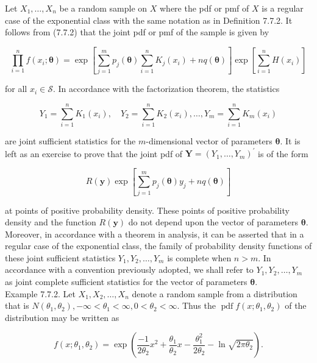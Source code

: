 Let $X_{1}, \ldots, X_{n}$ be a random sample on $X$ where the pdf or pmf of $X$ is a regular case of the exponential class with the same notation as in Definition 7.7.2. It follows from (7.7.2) that the joint pdf or pmf of the sample is given by


\begin{equation*}
\prod_{i=1}^{n} f\left(x_{i} ; \boldsymbol{\theta}\right)=\exp \left[\sum_{j=1}^{m} p_{j}(\boldsymbol{\theta}) \sum_{i=1}^{n} K_{j}\left(x_{i}\right)+n q(\boldsymbol{\theta})\right] \exp \left[\sum_{i=1}^{n} H\left(x_{i}\right)\right] \tag{7.7.3}
\end{equation*}


for all $x_{i} \in \mathcal{S}$. In accordance with the factorization theorem, the statistics

$$
Y_{1}=\sum_{i=1}^{n} K_{1}\left(x_{i}\right), \quad Y_{2}=\sum_{i=1}^{n} K_{2}\left(x_{i}\right), \ldots, Y_{m}=\sum_{i=1}^{n} K_{m}\left(x_{i}\right)
$$

are joint sufficient statistics for the $m$-dimensional vector of parameters $\boldsymbol{\theta}$. It is left as an exercise to prove that the joint pdf of $\mathbf{Y}=\left(Y_{1}, \ldots, Y_{m}\right)^{\prime}$ is of the form


\begin{equation*}
R(\mathbf{y}) \exp \left[\sum_{j=1}^{m} p_{j}(\boldsymbol{\theta}) y_{j}+n q(\boldsymbol{\theta})\right] \tag{7.7.4}
\end{equation*}


at points of positive probability density. These points of positive probability density and the function $R(\mathbf{y})$ do not depend upon the vector of parameters $\boldsymbol{\theta}$. Moreover, in accordance with a theorem in analysis, it can be asserted that in a regular case of the exponential class, the family of probability density functions of these joint sufficient statistics $Y_{1}, Y_{2}, \ldots, Y_{m}$ is complete when $n>m$. In accordance with a convention previously adopted, we shall refer to $Y_{1}, Y_{2}, \ldots, Y_{m}$ as joint complete sufficient statistics for the vector of parameters $\boldsymbol{\theta}$.\\
Example 7.7.2. Let $X_{1}, X_{2}, \ldots, X_{n}$ denote a random sample from a distribution that is $N\left(\theta_{1}, \theta_{2}\right),-\infty<\theta_{1}<\infty, 0<\theta_{2}<\infty$. Thus the $\operatorname{pdf} f\left(x ; \theta_{1}, \theta_{2}\right)$ of the distribution may be written as

$$
f\left(x ; \theta_{1}, \theta_{2}\right)=\exp \left(\frac{-1}{2 \theta_{2}} x^{2}+\frac{\theta_{1}}{\theta_{2}} x-\frac{\theta_{1}^{2}}{2 \theta_{2}}-\ln \sqrt{2 \pi \theta_{2}}\right) .
$$

